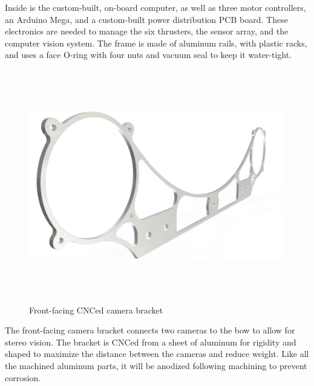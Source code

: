\documentclass[12pt, landscape]{article}
\begin{document}
	Inside is the custom-built, on-board computer, as well as three motor controllers, an Arduino Mega, and a custom-built power distribution PCB board.  These electronics are needed to manage the six thrusters, the sensor array, and the computer vision system.  The frame is made of aluminum rails, with plastic racks, and uses a face O-ring with four nuts and vacuum seal to keep it water-tight. 

	\begin{figure}[H]
		\centering
		\includegraphics[height=4in]{media/front_camera_bracket.png}
		\caption{Front-facing CNCed camera bracket}
		\label{camera_bracket}
	\end{figure}

	The front-facing camera bracket connects two cameras to the bow to allow for stereo vision.  The bracket is CNCed from a sheet of aluminum for rigidity and shaped to maximize the distance between the cameras and reduce weight.  Like all the machined aluminum parts, it will be anodized following machining to prevent corrosion.
\end{document}
